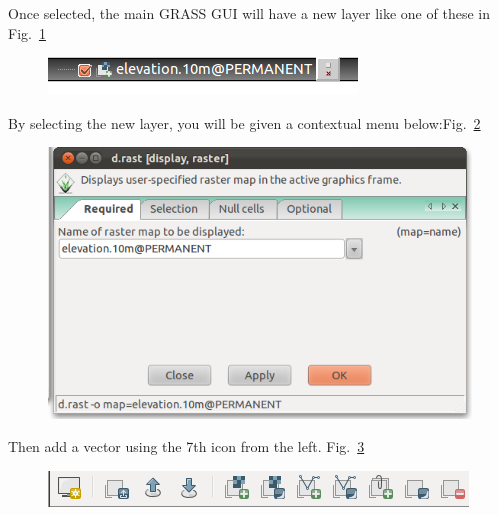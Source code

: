 Once selected, the main GRASS GUI will have a new layer like one of
these in Fig.~\ref{fig:grass004}

\begin{figure}[htbp]
   \centering
   \includegraphics[scale=0.5]{grass004.png}
   \caption{}
   \label{fig:grass004}
\end{figure}

By selecting the new layer, you will be given a contextual menu below:Fig.~\ref{fig:grass005}

\begin{figure}[htbp]
   \centering
   \includegraphics[scale=0.35]{grass005.png}
   \caption{}
   \label{fig:grass005}
\end{figure}

Then add a vector using the 7th icon from the left. Fig.~\ref{fig:grass006}

\begin{figure}[htbp]
   \centering
   \includegraphics[scale=0.5]{grass006.png}
   \caption{}
   \label{fig:grass006}
\end{figure}

